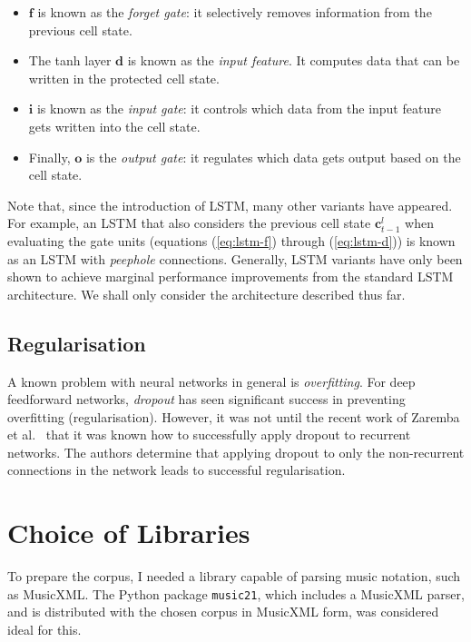 \documentclass[12pt,a4paper,twoside,openright]{report}
\newcommand{\vect}[1]{\boldsymbol{\mathbf{#1}}}
\begin{document}
\begin{itemize}
  \item $\vect{f}$ is known as the \emph{forget gate}: it selectively removes
    information from the previous cell state.
  \item The tanh layer $\vect{d}$ is known as the \emph{input feature}. It
    computes data that can be written in the protected cell state.
\item $\vect{i}$ is known as the \emph{input gate}: it controls which data from
  the input feature gets written into the cell state.
\item Finally, $\vect{o}$ is the \emph{output gate}: it regulates which data
  gets output based on the cell state.
\end{itemize}

Note that, since the introduction of LSTM, many other variants have appeared.
For example, an LSTM that also considers the previous cell state
$\vect{c}_{t-1}^l$ when evaluating the gate units (equations (\ref{eq:lstm-f})
through (\ref{eq:lstm-d})) is known as an LSTM with \emph{peephole} connections.
Generally, LSTM variants have only been shown to achieve marginal performance
improvements from the standard LSTM architecture. We shall only consider the
architecture described thus far.

\subsection{Regularisation}

A known problem with neural networks in general is \emph{overfitting}. For deep
feedforward networks, \emph{dropout} \cite{srivastava2014dropout} has seen
significant success in preventing overfitting (regularisation). However, it was
not until the recent work of Zaremba et al.\ \cite{zaremba2014recurrent} that it
was known how to successfully apply dropout to recurrent networks. The authors
determine that applying dropout to only the non-recurrent connections in the
network leads to successful regularisation. 

\section{Choice of Libraries}

To prepare the corpus, I needed a library capable of parsing music notation,
such as MusicXML. The Python package \texttt{music21}, which includes a MusicXML
parser, and is distributed with the chosen corpus in MusicXML form, was
considered ideal for this. 
\end{document}
